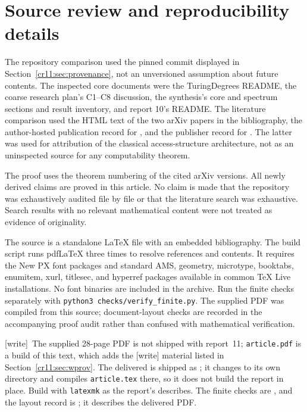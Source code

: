 \documentclass[11pt,letterpaper]{article}
\theoremstyle{plain}
\theoremstyle{definition}
\theoremstyle{remark}
\numberwithin{equation}{section}
\newcommand{\wtag}{\textup{[write]}}
\begin{document}
\section{Source review and reproducibility details}\label{cr11:app:sources}

The repository comparison used the pinned commit displayed in
Section~\ref{cr11:sec:provenance}, not an unversioned assumption about future
contents. The inspected core documents were the TuringDegrees README,
the coarse research plan's C1--C8 discussion, the synthesis's core and
spectrum sections and result inventory, and report 10's README. The
literature comparison used the HTML text of the two arXiv papers in the
bibliography, the author-hosted publication record for \cite{HJKS}, and
the publisher record for \cite{ISN}. The latter was used for attribution
of the classical access-structure architecture, not as an uninspected
source for any computability theorem.

The proof uses the theorem numbering of the cited arXiv versions. All
newly derived claims are proved in this article. No claim is made that the
repository was exhaustively audited file by file or that the literature
search was exhaustive. Search results with no relevant mathematical
content were not treated as evidence of originality.

The source is a standalone \LaTeX{} file with an embedded bibliography.
The build script runs pdf\LaTeX{} three times to resolve references and
contents. It requires the New PX font packages and standard AMS,
geometry, microtype, booktabs, enumitem, xurl, titlesec, and hyperref
packages available in common TeX Live installations. No font binaries are
included in the archive. Run the finite checks separately with
\texttt{python3 checks/verify\_finite.py}. The supplied PDF was compiled
from this source; document-layout checks are recorded in the accompanying
proof audit rather than confused with mathematical verification.

\noindent\wtag\ The supplied 28-page PDF is not shipped with report~11;
\texttt{article.pdf} is a build of this text, which adds the \wtag{}
material listed in Section~\ref{cr11:sec:wprov}. The delivered
 is shipped as ; it changes to its own
directory and compiles \texttt{article.tex} there, so it does not build the
report in place. Build with \texttt{latexmk} as the report's
 describes. The finite checks are
, and the layout record is
; it describes the delivered PDF.
\end{document}
